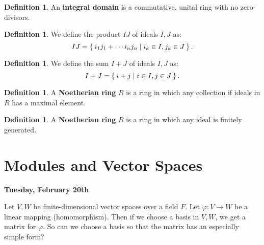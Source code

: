 \documentclass[12pt]{amsbook}
\theoremstyle{plain}
\numberwithin{section}{chapter}
\numberwithin{equation}{chapter}
\theoremstyle{definition}
\newtheorem{Def}[theorem]{Definition}
\theoremstyle{remark}
\renewcommand{\phi}{\varphi}
\begin{document}
\begin{Def}
An \textbf{integral domain} is a commutative, unital ring with no zero-divisors. 
\end{Def}

\begin{Def}
We define the product $IJ$ of ideals $I,J$ as:
$$
IJ = \Set{i_1j_1 + \cdots i_nj_n|i_k \in I,j_k \in J}.
$$
\end{Def}

\begin{Def}
We define the sum $I+J$ of ideals $I,J$ as:
$$
I+J = \Set{i + j|i\in I,j \in J}.
$$
\end{Def}

\begin{Def}
A \textbf{Noetherian ring} $R$ is a ring in which any collection if ideals in $R$ has a maximal element. 
\end{Def}

\begin{Def}
A \textbf{Noetherian ring} $R$ is a ring in which any ideal is finitely generated. 
\end{Def}






\mainmatter
%
\setcounter{part}{2}
\part{Modules and Vector Spaces}
\setcounter{chapter}{9}





\textbf{Tuesday, February 20th}


Let $V,W$ be finite-dimensional vector spaces over a field $F$. Let $\phi:V \to W$ be a linear mapping (homomorphism). Then if we choose a basis in $V,W$, we get a matrix for $\phi$. So can we choose a basis so that the matrix has an especially simple form?
\end{document}
